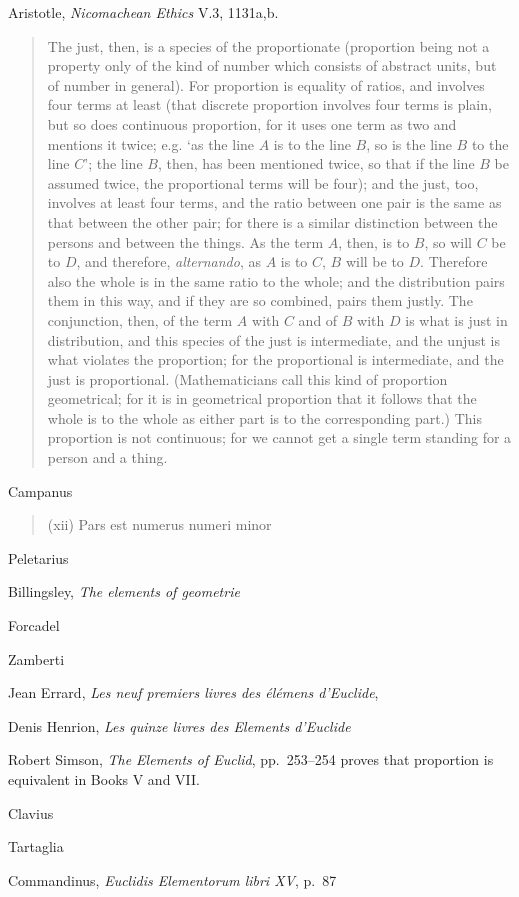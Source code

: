 \documentclass{article}
\begin{document}
Aristotle, {\em Nicomachean Ethics} V.3, 1131a,b.

\begin{quote}
The just, then, is a species of the proportionate (proportion
being not a property only of the kind of number which consists of
abstract units, but of number in general). For proportion is equality
of ratios, and involves four terms at least (that discrete proportion
involves four terms is plain, but so does continuous proportion, for
it uses one term as two and mentions it twice; e.g. `as the line $A$ is
to the line $B$, so is the line $B$ to the line $C$'; the line $B$, then, has been
mentioned twice, so that if the line $B$ be assumed twice, the proportional
terms will be four); and the just, too, involves at least four
terms, and the ratio between one pair is the same as that between
the other pair; for there is a similar distinction between the persons
and between the things. As the term $A$, then, is to $B$, so will $C$ be
to $D$, and therefore, {\em alternando}, as $A$ is to $C$, $B$ will be to $D$.
Therefore also the whole is in the same ratio to the whole; and the
distribution pairs them in this way, and if they are so combined,
pairs them justly. The conjunction, then, of the term $A$ with $C$ and
of $B$ with $D$ is what is just in distribution, and this species of the
just is intermediate, and the unjust is what violates the proportion;
for the proportional is intermediate, and the just is proportional.
(Mathematicians call this kind of proportion geometrical; for it is
in geometrical proportion that it follows that the whole is to the
whole as either part is to the corresponding part.) This proportion
is not continuous; for we cannot get a single term standing for a
person and a thing.
\end{quote}

Campanus

\begin{quote}
(xii) Pars est numerus numeri minor 
\end{quote}

Peletarius

Billingsley, {\em The elements of geometrie}

Forcadel

Zamberti

Jean Errard, {\em Les neuf premiers livres des \'el\'emens d'Euclide},

Denis Henrion, {\em Les quinze livres des Elements d'Euclide}

Robert Simson, {\em The Elements of Euclid}, pp.~253--254 proves that proportion is equivalent in Books V and VII.

\begin{quote}

\end{quote}

Clavius

Tartaglia

Commandinus, {\em Euclidis Elementorum libri XV}, p.~87

\begin{quote}

\end{quote}



\end{document}
